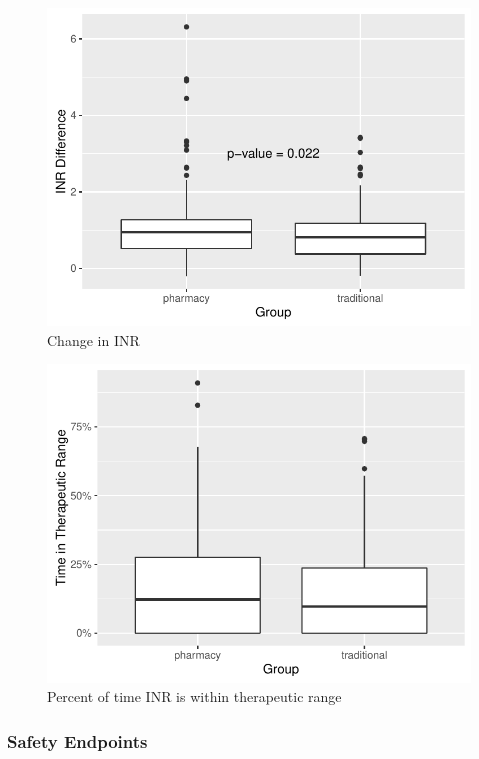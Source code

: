 \documentclass[]{article}
\begin{document}
\begin{figure}[H]
\centering
\includegraphics{warfarin_analysis_ASHP_files/figure-latex/inr2-1.pdf}
\caption{Change in INR}
\end{figure}

\begin{figure}[H]
\centering
\includegraphics{warfarin_analysis_ASHP_files/figure-latex/ttr-1.pdf}
\caption{Percent of time INR is within therapeutic range}
\end{figure}

\subsubsection{Safety Endpoints}\label{safety-endpoints}
\end{document}
